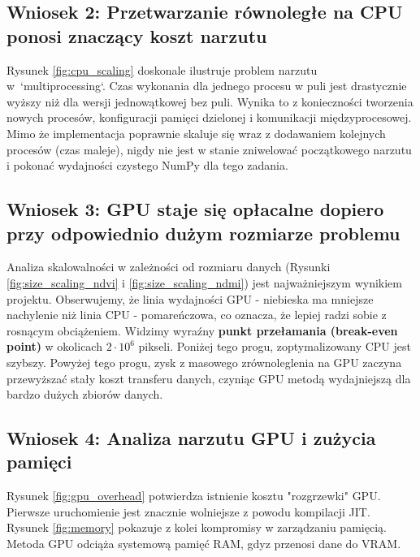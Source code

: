 \documentclass[12pt,a4paper]{article}
\begin{document}
\subsection{Wniosek 2: Przetwarzanie równoległe na CPU ponosi znaczący koszt narzutu}
Rysunek \ref{fig:cpu_scaling} doskonale ilustruje problem narzutu w~`multiprocessing`. Czas wykonania dla jednego procesu w puli jest drastycznie wyższy niż dla wersji jednowątkowej bez puli. Wynika to z konieczności tworzenia nowych procesów, konfiguracji pamięci dzielonej i komunikacji międzyprocesowej. Mimo że implementacja poprawnie skaluje się wraz z dodawaniem kolejnych procesów (czas maleje), nigdy nie jest w stanie zniwelować początkowego narzutu i pokonać wydajności czystego NumPy dla tego zadania.

\subsection{Wniosek 3: GPU staje się opłacalne dopiero przy odpowiednio dużym rozmiarze problemu}
Analiza skalowalności w zależności od rozmiaru danych (Rysunki \ref{fig:size_scaling_ndvi} i \ref{fig:size_scaling_ndmi}) jest najważniejszym wynikiem projektu. Obserwujemy, że linia wydajności GPU - niebieska ma mniejsze nachylenie niż linia CPU - pomareńczowa, co oznacza, że lepiej radzi sobie z rosnącym obciążeniem. Widzimy wyraźny \textbf{punkt przełamania (break-even point)} w okolicach \(2 \cdot 10^6\) pikseli. Poniżej tego progu, zoptymalizowany CPU jest szybszy. Powyżej tego progu, zysk z masowego zrównoleglenia na GPU zaczyna przewyższać stały koszt transferu danych, czyniąc GPU metodą wydajniejszą dla bardzo dużych zbiorów danych.

\subsection{Wniosek 4: Analiza narzutu GPU i zużycia pamięci}
Rysunek \ref{fig:gpu_overhead} potwierdza istnienie kosztu "rozgrzewki" GPU. Pierwsze uruchomienie jest znacznie wolniejsze z powodu kompilacji JIT. Rysunek \ref{fig:memory} pokazuje z kolei kompromisy w zarządzaniu pamięcią. Metoda GPU odciąża systemową pamięć RAM, gdyz przenosi dane do VRAM.
\end{document}
